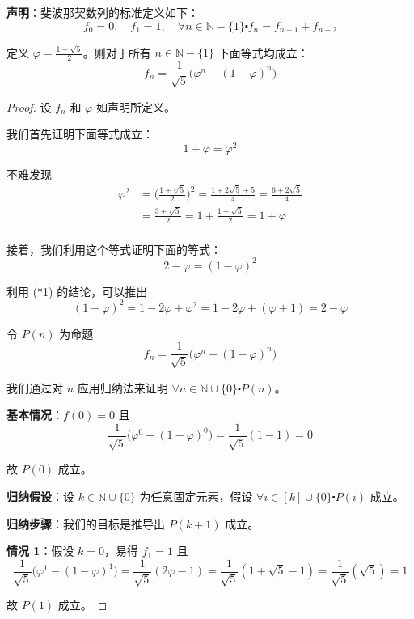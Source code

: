 \begin{example}[斐波那契数列的封闭形式]

    \textbf{声明}：斐波那契数列的标准定义如下：
    \[f_0 = 0, \quad f_1 = 1, \quad \forall n \in \mathbb{N}-\{1\} \centerdot f_n = f_{n-1} + f_{n-2}\]

    定义 $\varphi = \frac{1+\sqrt{5}}{2}$。则对于所有 $n \in \mathbb{N}-\{1\}$ 下面等式均成立：
    \[f_n = \frac{1}{\sqrt{5}}\big(\varphi^n-(1-\varphi)^n\big)\]

    \begin{proof}
        设 $f_n$ 和 $\varphi$ 如声明所定义。

        我们首先证明下面等式成立：
        \[1+\varphi=\varphi^2 \tag{*1}\]

        不难发现
        \begin{align*}
            \varphi^2 &= \Big(\frac{1+\sqrt{5}}{2}\Big)^2 = \frac{1+2\sqrt{5}+5}{4} = \frac{6+2\sqrt{5}}{4} \\
            &= \frac{3+\sqrt{5}}{2} = 1+\frac{1+\sqrt{5}}{2} = 1+\varphi \\
        \end{align*}

        接着，我们利用这个等式证明下面的等式：
        \[2-\varphi=(1-\varphi)^2 \tag{*2}\]

        利用 (*1) 的结论，可以推出
        \[(1-\varphi)^2 = 1-2\varphi+\varphi^2 = 1-2\varphi+(\varphi+1) = 2-\varphi\]

        令 $P(n)$ 为命题
        \[f_n = \frac{1}{\sqrt{5}}\big(\varphi^n-(1-\varphi)^n\big)\]

        我们通过对 $n$ 应用归纳法来证明 $\forall n \in \mathbb{N} \cup \{0\} \centerdot P(n)$。

        \textbf{基本情况}：$f(0) = 0$ 且
        \[\frac{1}{\sqrt{5}}\big(\varphi^0-(1-\varphi)^0\big) = \frac{1}{\sqrt{5}} (1-1) = 0\]

        故 $P(0)$ 成立。

        \textbf{归纳假设}：设 $k \in \mathbb{N} \cup \{0\}$ 为任意固定元素，假设 $\forall i \in [k] \cup \{0\} \centerdot P(i)$ 成立。

        \textbf{归纳步骤}：我们的目标是推导出 $P(k+1)$ 成立。

        \textbf{情况 1}：假设 $k=0$，易得 $f_1=1$ 且
        \[\frac{1}{\sqrt{5}}\big(\varphi^1-(1-\varphi)^1\big) = \frac{1}{\sqrt{5}} (2\varphi-1) = \frac{1}{\sqrt{5}} (1+\sqrt{5}-1) = \frac{1}{\sqrt{5}} (\sqrt{5}) = 1\]

        故 $P(1)$ 成立。


\end{proof}
\end{example}
